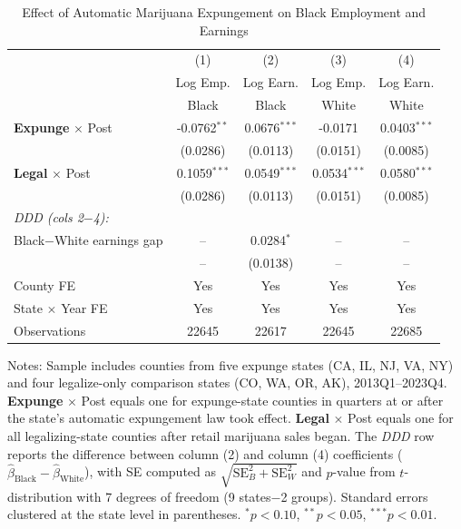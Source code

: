 \begin{table}[h!]
\centering
\caption{Effect of Automatic Marijuana Expungement on Black Employment and Earnings}
\label{tab:main}
\begin{tabular}{lcccc}
\toprule
 & (1) & (2) & (3) & (4) \\
 & Log Emp. & Log Earn. & Log Emp. & Log Earn. \\
 & Black & Black & White & White \\
\midrule
\textbf{Expunge} $\times$ Post & -0.0762$^{**}$ & 0.0676$^{***}$ & -0.0171 & 0.0403$^{***}$ \\
 & (0.0286) & (0.0113) & (0.0151) & (0.0085) \\
\textbf{Legal} $\times$ Post & 0.1059$^{***}$ & 0.0549$^{***}$ & 0.0534$^{***}$ & 0.0580$^{***}$ \\
 & (0.0286) & (0.0113) & (0.0151) & (0.0085) \\
\midrule
\textit{DDD (cols 2$-$4):} & & & & \\
\quad Black$-$White earnings gap & -- & 0.0284$^{*}$ & -- & -- \\
 & -- & (0.0138) & -- & -- \\
\midrule
County FE & Yes & Yes & Yes & Yes \\
State $\times$ Year FE & Yes & Yes & Yes & Yes \\
Observations & 22645 & 22617 & 22645 & 22685 \\
\bottomrule
\end{tabular}
\begin{tablenotes}
\small
\item Notes: Sample includes counties from five expunge states (CA, IL, NJ, VA, NY) and four legalize-only comparison states (CO, WA, OR, AK), 2013Q1--2023Q4. \textbf{Expunge} $\times$ Post equals one for expunge-state counties in quarters at or after the state's automatic expungement law took effect. \textbf{Legal} $\times$ Post equals one for all legalizing-state counties after retail marijuana sales began. The \textit{DDD} row reports the difference between column (2) and column (4) coefficients ($\hat{\beta}_{\text{Black}} - \hat{\beta}_{\text{White}}$), with SE computed as $\sqrt{\text{SE}_B^2 + \text{SE}_W^2}$ and $p$-value from $t$-distribution with 7 degrees of freedom (9 states$-$2 groups). Standard errors clustered at the state level in parentheses. $^{*}p<0.10$, $^{**}p<0.05$, $^{***}p<0.01$.
\end{tablenotes}
\end{table}

